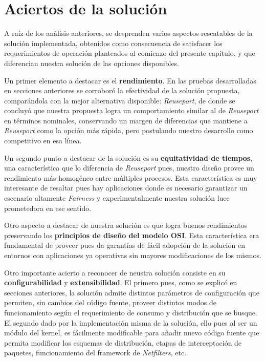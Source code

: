 \section{Aciertos de la solución}

A raíz de los análisis anteriores, se desprenden varios aspectos rescatables de la solución implementada, obtenidos como consecuencia de satisfacer los requerimientos de operación planteados al comienzo del presente capítulo, y que diferencian nuestra solución de las opciones disponibles.

Un primer elemento a destacar es el \textbf{rendimiento}. En las pruebas desarrolladas en secciones anteriores se corroboró la efectividad de la solución propuesta, comparándola con la mejor alternativa disponible: \emph{Reuseport}, de donde se concluyó que nuestra propuesta logra un comportamiento similar al de \emph{Reuseport} en términos nominales, conservando un margen de diferencias que mantiene a \emph{Reuseport} como la opción más rápida, pero postulando nuestro desarrollo como competitivo en esa línea.

Un segundo punto a destacar de la solución es su \textbf{equitatividad de tiempos}, una característica que lo diferencia de \emph{Reuseport} pues, nuestro diseño provee un rendimiento más homogéneo entre múltiples procesos. Esta característica es muy interesante de resaltar pues hay aplicaciones donde es necesario garantizar un escenario altamente \emph{Fairness} y experimentalmente nuestra solución luce prometedora en ese sentido.

Otro aspecto a destacar de nuestra solución es que logra buenos rendimientos preservando los \textbf{principios de diseño del modelo OSI}. Esta característica era fundamental de proveer pues da garantías de fácil adopción de la solución en entornos con aplicaciones ya operativas sin mayores modificaciones de los mismos.

Otro importante acierto a reconocer de neustra solución consiste en su \textbf{configurabilidad} y \textbf{extensibilidad}. El primero pues, como se explicó en secciones anteriores, la solución admite distintos parámetros de configuración que permiten, sin cambios del código fuente, proveer distintos modos de funcionamiento según el requerimiento de consumo y distribución que se busque. El segundo dado por la implementación misma de la solución, ello pues al ser un módulo del kernel, es fácilmente modificable para añadir nuevo código fuente que permita modificar los esquemas de distribución, etapas de interceptación de paquetes, funcionamiento del framework de \emph{Netfilters}, etc.

